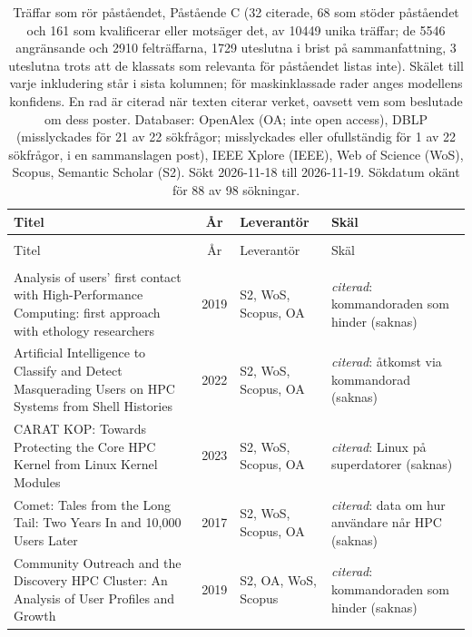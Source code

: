 \begin{longtable}{@{}%
  >{\raggedright\arraybackslash}p{}c%
  >{\raggedright\arraybackslash}p{}%
  >{\raggedright\arraybackslash}p{}@{}}
\caption{Träffar som rör påståendet, Påstående C (32 citerade, 68 som stöder påståendet och 161 som kvalificerar eller motsäger det, av 10449 unika träffar; de 5546 angränsande och 2910 felträffarna, 1729 uteslutna i brist på sammanfattning, 3 uteslutna trots att de klassats som relevanta för påståendet listas inte). Skälet till varje inkludering står i sista kolumnen; för maskinklassade rader anges modellens konfidens. En rad är citerad när texten citerar verket, oavsett vem som beslutade om dess poster. Databaser: OpenAlex (OA; inte open access), DBLP (misslyckades för 21 av 22 sökfrågor; misslyckades eller ofullständig för 1 av 22 sökfrågor, i en sammanslagen post), IEEE Xplore (IEEE), Web of Science (WoS), Scopus, Semantic Scholar (S2). Sökt 2026-11-18 till 2026-11-19. Sökdatum okänt för 88 av 98 sökningar.}\label{tab:sok-hpc-cli}\\
\toprule
Titel & År & Leverantör & Skäl \\
\midrule
\endfirsthead
\multicolumn{4}{@{}l}{\emph{\tablename~\thetable{} (forts.)}}\\
\toprule
Titel & År & Leverantör & Skäl \\
\midrule
\endhead
\midrule \multicolumn{4}{r@{}}{\emph{forts.\ på nästa sida}}\\
\endfoot
\bottomrule
\endlastfoot
Analysis of users' first contact with High-Performance Computing: first approach with ethology researchers & 2019 & S2, WoS, Scopus, OA & \emph{citerad}: kommandoraden som hinder (saknas) \\
Artificial Intelligence to Classify and Detect Masquerading Users on HPC Systems from Shell Histories & 2022 & S2, WoS, Scopus, OA & \emph{citerad}: åtkomst via kommandorad (saknas) \\
CARAT KOP: Towards Protecting the Core HPC Kernel from Linux Kernel Modules & 2023 & S2, WoS, Scopus, OA & \emph{citerad}: Linux på superdatorer (saknas) \\
Comet: Tales from the Long Tail: Two Years In and 10,000 Users Later & 2017 & S2, WoS, Scopus, OA & \emph{citerad}: data om hur användare når HPC (saknas) \\
Community Outreach and the Discovery HPC Cluster: An Analysis of User Profiles and Growth & 2019 & S2, OA, WoS, Scopus & \emph{citerad}: kommandoraden som hinder (saknas) \\

\end{longtable}
